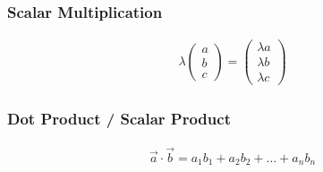 \documentclass{article}
\begin{document}
\subsubsection{Scalar Multiplication}
\begin{align*}
    \lambda
    \begin{pmatrix}
        a \\ b \\ c
    \end{pmatrix}
    =
    \begin{pmatrix}
        \lambda a \\ \lambda b \\ \lambda c
    \end{pmatrix}
\end{align*}
\subsubsection{Dot Product / Scalar Product}
\begin{align*}
    \vec{a} \cdot \vec{b} = a_1 b_1 + a_2 b_2 + ... + a_n b_n
\end{align*}
\end{document}
